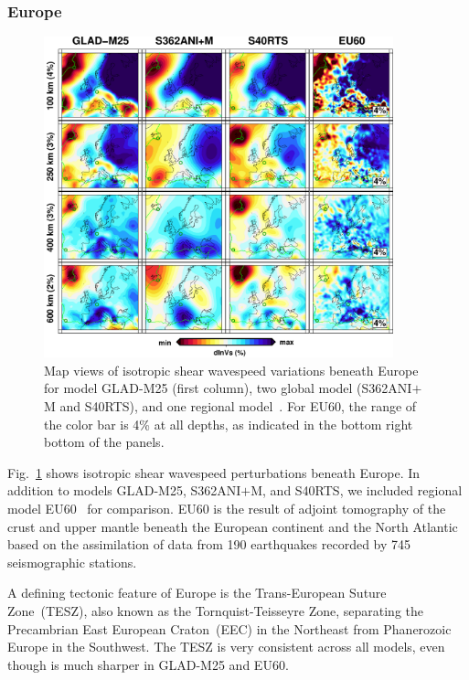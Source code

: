 \documentclass[extra,mreferee]{gji}
\begin{document}
\subsubsection{Europe}

\begin{figure}[ht!]
\includegraphics[width=0.9\textwidth]{figures/depth_slice/europe_vs.pdf}
  \caption{\small{Map views of isotropic shear wavespeed variations beneath Europe for model GLAD-M25 (first column), two global model (S362ANI$+$M and S40RTS), and
  one regional model~\citep[EU60;][]{zhu2015seismic}. For EU60, the range of the color
  bar is 4\% at all depths, as indicated in the bottom right bottom of the panels.}}
\label{fig:europe-vs}
\centering
\end{figure}

Fig.~\ref{fig:europe-vs} shows isotropic shear wavespeed perturbations beneath Europe.
In addition to models GLAD-M25, S362ANI$+$M, and S40RTS, we included regional
model EU60~\citep{zhu2015seismic} for comparison.
EU60 is the result of adjoint tomography of the crust and upper mantle
beneath the European continent and the North Atlantic based on the assimilation of data from
190 earthquakes recorded by 745 seismographic stations.

A defining tectonic feature of Europe is the Trans-European Suture Zone~(TESZ),
also known as the Tornquist-Teisseyre Zone,
separating the Precambrian East European Craton~(EEC) in the Northeast from
Phanerozoic Europe in the Southwest.
The TESZ is very consistent across all models,
even though is much sharper in GLAD-M25 and EU60.
\end{document}
